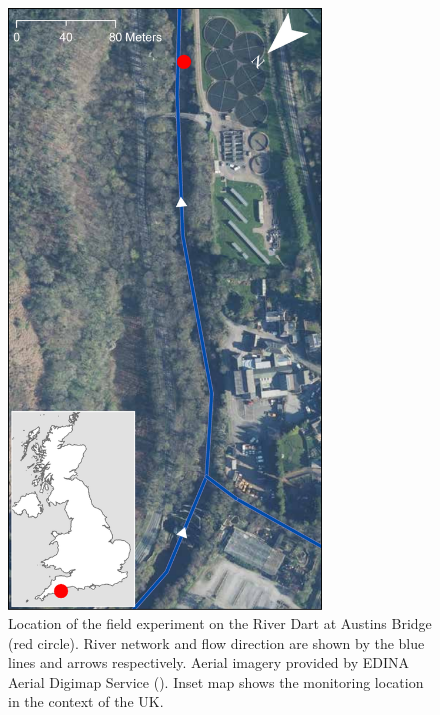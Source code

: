 \documentclass[hess, manuscript]{copernicus} %
\begin{document}
\begin{figure}[!htb]
\centering 
\includegraphics[width=8.3cm]{Main/Initial_submission_2024/Figures/Figure1.pdf}
\caption{Location of the field experiment on the River Dart at Austins Bridge (red circle). River network and flow direction are shown by the blue lines and arrows respectively. Aerial imagery provided by EDINA Aerial Digimap Service (\citeyear{EDINA2022}). Inset map shows the monitoring location in the context of the UK.}
\label{Figure1} 
\end{figure}

\end{document}

